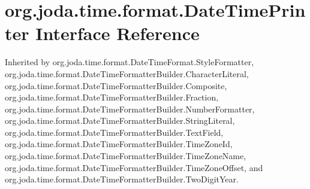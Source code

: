 \hypertarget{interfaceorg_1_1joda_1_1time_1_1format_1_1_date_time_printer}{\section{org.\-joda.\-time.\-format.\-Date\-Time\-Printer Interface Reference}
\label{interfaceorg_1_1joda_1_1time_1_1format_1_1_date_time_printer}
}


Inherited by org.\-joda.\-time.\-format.\-Date\-Time\-Format.\-Style\-Formatter, org.\-joda.\-time.\-format.\-Date\-Time\-Formatter\-Builder.\-Character\-Literal, org.\-joda.\-time.\-format.\-Date\-Time\-Formatter\-Builder.\-Composite, org.\-joda.\-time.\-format.\-Date\-Time\-Formatter\-Builder.\-Fraction, org.\-joda.\-time.\-format.\-Date\-Time\-Formatter\-Builder.\-Number\-Formatter, org.\-joda.\-time.\-format.\-Date\-Time\-Formatter\-Builder.\-String\-Literal, org.\-joda.\-time.\-format.\-Date\-Time\-Formatter\-Builder.\-Text\-Field, org.\-joda.\-time.\-format.\-Date\-Time\-Formatter\-Builder.\-Time\-Zone\-Id, org.\-joda.\-time.\-format.\-Date\-Time\-Formatter\-Builder.\-Time\-Zone\-Name, org.\-joda.\-time.\-format.\-Date\-Time\-Formatter\-Builder.\-Time\-Zone\-Offset, and org.\-joda.\-time.\-format.\-Date\-Time\-Formatter\-Builder.\-Two\-Digit\-Year.

